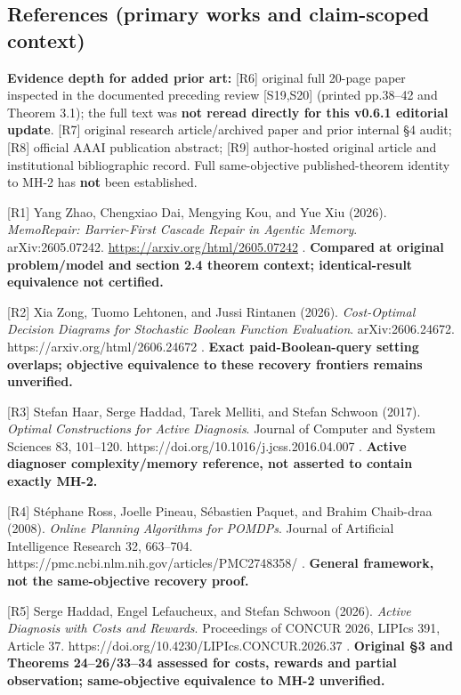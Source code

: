\documentclass[
  10pt,
  american,
  a4paper,
]{article}
\begin{document}
\hypertarget{references-primary-works-and-claim-scoped-context}{%
\subsection{References (primary works and claim-scoped
context)}\label{references-primary-works-and-claim-scoped-context}}

\textbf{Evidence depth for added prior art:} {[}R6{]} original full
20-page paper inspected in the documented preceding review {[}S19,S20{]}
(printed pp.38--42 and Theorem 3.1); the full text was \textbf{not
reread directly for this v0.6.1 editorial update}. {[}R7{]} original
research article/archived paper and prior internal §4 audit; {[}R8{]}
official AAAI publication abstract; {[}R9{]} author-hosted original
article and institutional bibliographic record. Full same-objective
published-theorem identity to MH-2 has \textbf{not} been established.

{[}R1{]} Yang Zhao, Chengxiao Dai, Mengying Kou, and Yue Xiu (2026).
\emph{MemoRepair: Barrier-First Cascade Repair in Agentic Memory}.
arXiv:2605.07242. \url{https://arxiv.org/html/2605.07242} .
\textbf{Compared at original problem/model and section 2.4 theorem
context; identical-result equivalence not certified.}

{[}R2{]} Xia Zong, Tuomo Lehtonen, and Jussi Rintanen (2026).
\emph{Cost-Optimal Decision Diagrams for Stochastic Boolean Function
Evaluation}. arXiv:2606.24672. https://arxiv.org/html/2606.24672 .
\textbf{Exact paid-Boolean-query setting overlaps; objective equivalence
to these recovery frontiers remains unverified.}

{[}R3{]} Stefan Haar, Serge Haddad, Tarek Melliti, and Stefan Schwoon
(2017). \emph{Optimal Constructions for Active Diagnosis}. Journal of
Computer and System Sciences 83, 101--120.
https://doi.org/10.1016/j.jcss.2016.04.007 . \textbf{Active diagnoser
complexity/memory reference, not asserted to contain exactly MH-2.}

{[}R4{]} Stéphane Ross, Joelle Pineau, Sébastien Paquet, and Brahim
Chaib-draa (2008). \emph{Online Planning Algorithms for POMDPs}. Journal
of Artificial Intelligence Research 32, 663--704.
https://pmc.ncbi.nlm.nih.gov/articles/PMC2748358/ . \textbf{General
framework, not the same-objective recovery proof.}

{[}R5{]} Serge Haddad, Engel Lefaucheux, and Stefan Schwoon (2026).
\emph{Active Diagnosis with Costs and Rewards}. Proceedings of CONCUR
2026, LIPIcs 391, Article 37.
https://doi.org/10.4230/LIPIcs.CONCUR.2026.37 . \textbf{Original §3 and
Theorems 24--26/33--34 assessed for costs, rewards and partial
observation; same-objective equivalence to MH-2 unverified.}
\end{document}
